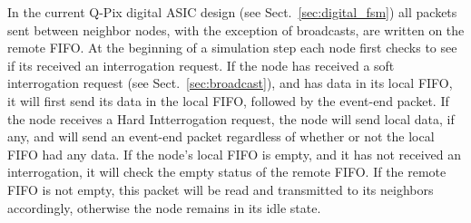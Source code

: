 In the current Q-Pix digital ASIC design (see Sect.~\ref{sec:digital_fsm}) all packets sent between neighbor nodes, with the exception of broadcasts, are written on the remote FIFO.
At the beginning of a simulation step each node first checks to see if its received an interrogation request.
If the node has received a soft interrogation request (see Sect.~\ref{sec:broadcast}), and has data in its local FIFO, it will first send its data in the local FIFO, followed by the event-end packet.
If the node receives a Hard Intterrogation request, the node will send local data, if any, and will send an event-end packet regardless of whether or not the local FIFO had any data.
If the node's local FIFO is empty, and it has not received an interrogation, it will check the empty status of the remote FIFO.
If the remote FIFO is not empty, this packet will be read and transmitted to its neighbors accordingly, otherwise the node remains in its idle state.

